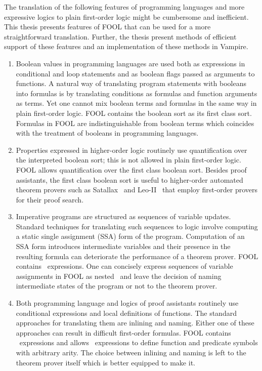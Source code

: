 The translation of the following features of programming languages and more expressive logics to plain first-order logic might be cumbersome and inefficient. This thesis presents features of FOOL that can be used for a more straightforward translation. Further, the thesis present methods of efficient support of these features and an implementation of these methods in Vampire.
\begin{enumerate}
  \item Boolean values in programming languages are used both as expressions in conditional and loop statements and as boolean flags passed as arguments to functions. A natural way of translating program statements with booleans into formulas is by translating conditions as formulas and function arguments as terms. Yet one cannot mix boolean terms and formulas in the same way in plain first-order logic. FOOL contains the boolean sort as its first class sort. Formulas in FOOL are indistinguishable from boolean terms which coincides with the treatment of booleans in programming languages.
  \item Properties expressed in higher-order logic routinely use quantification over the interpreted boolean sort; this is not allowed in plain first-order logic. FOOL allows quantification over the first class boolean sort. Besides proof assistants, the first class boolean sort is useful to higher-order automated theorem provers such as Satallax~\cite{Satallax} and Leo-II~\cite{LeoII} that employ first-order provers for their proof search.
  \item Imperative programs are structured as sequences of variable updates. Standard techniques for translating such sequences to logic involve computing a static single assignment (SSA) form of the program. Computation of an SSA form introduces intermediate variables and their presence in the resulting formula can deteriorate the performance of a theorem prover. FOOL contains \LETIN\ expressions. One can concisely express sequences of variable assignments in FOOL as nested \LETIN\ and leave the decision of naming intermediate states of the program or not to the theorem prover.
  \item Both programming language and logics of proof assistants routinely use conditional expressions and local definitions of functions. The standard approaches for translating them are inlining and naming. Either one of these approaches can result in difficult first-order formulas. FOOL contains \ITE\ expressions and allows \LETIN\ expressions to define function and predicate symbols with arbitrary arity. The choice between inlining and naming is left to the theorem prover itself which is better equipped to make it.
\end{enumerate}

